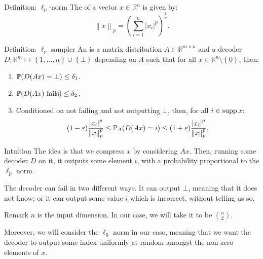 \documentclass[a4paper]{article}
\begin{document}
\begin{parag}{Definition: $\ell_p$-norm}
    The  of a vector $x \in \mathbb{R}^n$ is given by: 
    \[\left\|x\right\|_p = \left(\sum_{i=1}^{n} \left|x_i\right|^p\right)^{\frac{1}{p}}.\]
\end{parag}

\begin{parag}{Definition: $\ell_p$ sampler}
    An  is a matrix distribution $A \in \mathbb{R}^{m \times n}$ and a decoder $D : \mathbb{R}^m \mapsto \left\{1, \ldots, n\right\} \cup \left\{\bot\right\}$ depending on $A$ such that for all $x \in \mathbb{R}^n \setminus \left\{0\right\}$, then:
    \begin{enumerate}
        \item $\prob\left(D\left(A x\right) = \bot\right) \leq \delta_1$.
        \item $\prob\left(D\left(Ax\right) \text{ fails}\right) \leq \delta_2$.
        \item Conditioned on not failing and not outputting $\bot$, then, for all $i \in \operatorname{supp} x$: 
        \[\left(1 - \epsilon\right) \frac{\left|x_i\right|^p}{\left\|x\right\|_p^p} \leq \prob_A\left(D\left(Ax\right) = i\right) \leq \left(1+\epsilon\right) \frac{\left|x_i\right|^p}{\left\|x\right\|_p^p}.\]
    \end{enumerate}

    \begin{subparag}{Intuition}
        The idea is that we compress $x$ by considering $Ax$. Then, running some decoder $D$ on it, it outputs some element $i$, with a probability proportional to the $\ell_p$ norm.

        The decoder can fail in two different ways. It can output $\bot$, meaning that it does not know; or it can output some value $i$ which is incorrect, without telling us so.
    \end{subparag}

    \begin{subparag}{Remark}
        $n$ is the input dimension. In our case, we will take it to be $\binom{n}{2}$.

        Moreover, we will consider the $\ell_0$ norm in our case, meaning that we want the decoder to output some index uniformly at random amongst the non-zero elements of $x$.
    \end{subparag}
\end{parag}
\end{document}
